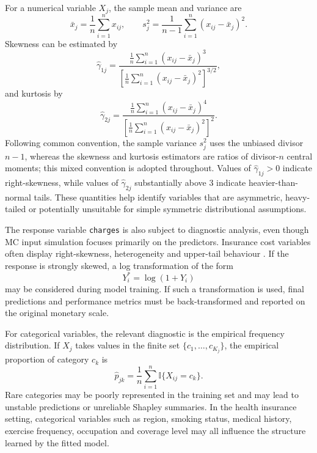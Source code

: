 \noindent
For a numerical variable \(X_j\), the sample mean and variance are
\[
    \bar{x}_j
    =
    \frac{1}{n}
    \sum_{i=1}^{n}
    x_{ij},
    \qquad
    s_j^2
    =
    \frac{1}{n-1}
    \sum_{i=1}^{n}
    \left(
        x_{ij} - \bar{x}_j
    \right)^2.
\]
Skewness can be estimated by
\[
    \widehat{\gamma}_{1j}
    =
    \frac{
    \frac{1}{n}\sum_{i=1}^{n}
    \left(
        x_{ij}-\bar{x}_j
    \right)^3
    }{
    \left[
    \frac{1}{n}\sum_{i=1}^{n}
    \left(
        x_{ij}-\bar{x}_j
    \right)^2
    \right]^{3/2}
    },
\]
and kurtosis by
\[
    \widehat{\gamma}_{2j}
    =
    \frac{
    \frac{1}{n}\sum_{i=1}^{n}
    \left(
        x_{ij}-\bar{x}_j
    \right)^4
    }{
    \left[
    \frac{1}{n}\sum_{i=1}^{n}
    \left(
        x_{ij}-\bar{x}_j
    \right)^2
    \right]^2
    }.
\]
Following common convention, the sample variance \(s_j^2\) uses the
unbiased divisor \(n-1\), whereas the skewness and kurtosis estimators are
ratios of divisor-\(n\) central moments; this mixed convention is adopted
throughout. Values of \(\widehat{\gamma}_{1j}>0\) indicate right-skewness, while values of
\(\widehat{\gamma}_{2j}\) substantially above \(3\) indicate heavier-than-normal
tails. These quantities help identify variables that are asymmetric,
heavy-tailed or potentially unsuitable for simple symmetric distributional
assumptions.

\noindent
The response variable \texttt{charges} is also subject to diagnostic analysis,
even though MC input simulation focuses primarily on the predictors.
Insurance cost variables often display right-skewness, heterogeneity and
upper-tail behaviour \citep{denuit2007actuarial}. If the response is strongly
skewed, a log transformation of the form
\[
    Y_i^{*}
    =
    \log(1+Y_i)
\]
may be considered during model training. If such a transformation is used, final
predictions and performance metrics must be back-transformed and reported on the
original monetary scale.

\noindent
For categorical variables, the relevant diagnostic is the empirical frequency
distribution. If \(X_j\) takes values in the finite set
\(\{c_1,\ldots,c_{K_j}\}\), the empirical proportion of category \(c_k\) is
\[
    \widehat{p}_{jk}
    =
    \frac{1}{n}
    \sum_{i=1}^{n}
    \mathbb{I}\{X_{ij}=c_k\}.
\]
Rare categories may be poorly represented in the training set and may lead to
unstable predictions or unreliable Shapley summaries. In the health insurance
setting, categorical variables such as region, smoking status, medical history,
exercise frequency, occupation and coverage level may all influence the
structure learned by the fitted model.

